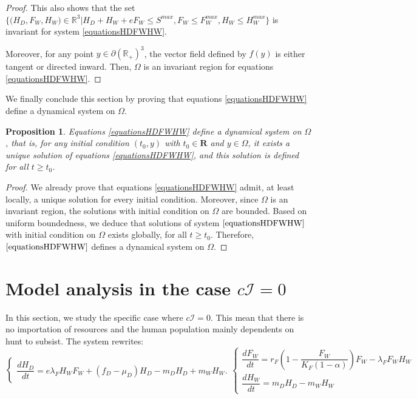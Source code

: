 \documentclass{article}
\newcommand{\lfw}{\lambda_{F}}
\newcommand{\lfw}{\lambda_{F}}
\newcommand{\cI}{c \mathcal{I}}
\newtheorem{prop}{Proposition}
\begin{document}
\begin{proof}
This also shows that the set  $\Big\{\Big(H_D, F_W, H_W \Big) \in \mathbb{R}^3  \Big|H_D + H_W + eF_W \leq S^{max}, F_W \leq F_W^{max}, H_W \leq H_W^{max} \Big\}$ is invariant for system \eqref{equationsHDFWHW}. 

Moreover, for any point $y \in \partial (\mathbb{R}_+)^3$, the vector field defined by $f(y)$ is either tangent or directed inward. Then, $\Omega$ is an invariant region for equations \eqref{equationsHDFWHW}. 
\end{proof}

We finally conclude this section by proving that equations \eqref{equationsHDFWHW} define a dynamical system on $\Omega$.

\begin{prop}
Equations \eqref{equationsHDFWHW} define a dynamical system on $\Omega$, that is, for any initial condition $(t_0, y)$ with $t_0 \in \mathbf{R}$ and $y \in \Omega$, it exists a unique solution of equations \eqref{equationsHDFWHW}, and this solution is defined for all $t \geq t_0$.
\end{prop}

\begin{proof}
We already prove that equations \eqref{equationsHDFWHW} admit, at least locally, a unique solution for every initial condition. Moreover, since $\Omega$ is an invariant region, the solutions with initial condition on $\Omega$ are bounded. Based on uniform boundedness, we deduce that solutions of system $\eqref{equationsHDFWHW}$ with initial condition on $\Omega$ exists globally, for all $t\geq t_0$. Therefore, $\eqref{equationsHDFWHW}$ defines a dynamical system on $\Omega$.
\end{proof}

\section{Model analysis in the case $\cI = 0$}
In this section, we study the specific case where $\cI = 0$. This mean that there is no importation of resources and the human population mainly dependents on hunt to subsist. The system rewrites:
\begin{subequations}
\begin{equation}
\left\{ \begin{array}{l}
\dfrac{dH_D}{dt}= e\lfw H_W F_W + (f_D - \mu_D) H_D - m_D H_D + m_W H_W.
\end{array}\right.
\end{equation}
\begin{equation}
\left\lbrace \begin{array}{l}
\dfrac{dF_W}{dt} = r_F \left(1 - \dfrac{F_W}{K_F(1-\alpha)} \right) F_W - \lfw F_W H_W \\
\dfrac{dH_W}{dt}= m_D H_D - m_W H_W 
\end{array} \right.
\end{equation}
\label{equationsHDFWHW, cI=0}
\end{subequations}
\end{document}
